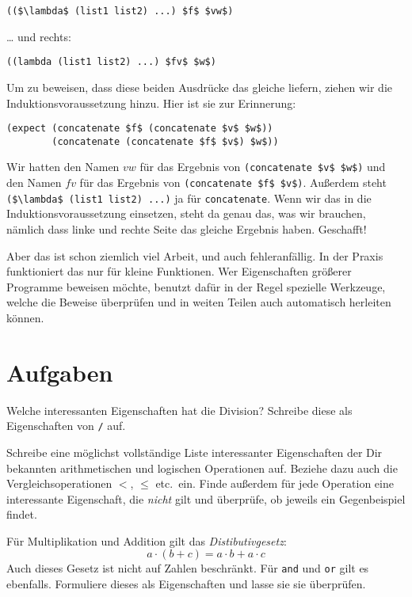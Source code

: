 \begin{lstlisting}
(($\lambda$ (list1 list2) ...) $f$ $vw$)
\end{lstlisting}
% 
\ldots{} und rechts:
\begin{lstlisting}
((lambda (list1 list2) ...) $fv$ $w$)
\end{lstlisting}
%
Um zu beweisen, dass diese beiden Ausdrücke das gleiche liefern,
ziehen wir die Induktionsvoraussetzung hinzu.  Hier ist sie zur
Erinnerung:
\begin{lstlisting}
(expect (concatenate $f$ (concatenate $v$ $w$))
        (concatenate (concatenate $f$ $v$) $w$))
\end{lstlisting}
% 
Wir hatten den Namen $vw$ für das Ergebnis von
\lstinline{(concatenate $v$ $w$)} und den Namen $fv$ für das
Ergebnis von \lstinline{(concatenate $f$ $v$)}.  Außerdem steht
\lstinline{($\lambda$ (list1 list2) ...)} ja für
\lstinline{concatenate}.  Wenn wir das in die
Induktionsvoraussetzung einsetzen, steht da genau das, was wir
brauchen, nämlich dass linke und rechte Seite das gleiche Ergebnis haben.
Geschafft!

Aber das ist schon ziemlich viel Arbeit, und auch
fehleranfällig.  In der Praxis funktioniert das nur für kleine
Funktionen.  Wer Eigenschaften größerer Programme beweisen möchte,
benutzt dafür in der Regel spezielle Werkzeuge, welche die Beweise
überprüfen und in weiten Teilen auch automatisch herleiten können.

\section*{Aufgaben}

\begin{aufgabe}
Welche interessanten Eigenschaften hat die Division?  Schreibe
diese als Eigenschaften von \lstinline{/} auf.
\end{aufgabe}

\begin{aufgabe}
  Schreibe eine möglichst vollständige Liste interessanter
  Eigenschaften der Dir bekannten arithmetischen 
  und logischen Operationen auf.  Beziehe dazu auch die
  Vergleichsoperationen $<$, $\leq$ etc.\ ein.  Finde außerdem
  für jede Operation eine interessante Eigenschaft, die \emph{nicht}
  gilt und überprüfe, ob \drscheme{} jeweils ein Gegenbeispiel
  findet.
\end{aufgabe}

\begin{aufgabe}
  \label{aufgabe:boolean-distrib}
  Für Multiplikation und Addition gilt das
  \textit{Distibutivgesetz}:
  \begin{displaymath}
    a\cdot(b + c) = a\cdot b + a \cdot c
  \end{displaymath}
  Auch dieses Gesetz ist nicht auf Zahlen beschränkt.  Für
  \lstinline{and} und \lstinline{or} gilt es ebenfalls.  Formuliere
  dieses als Eigenschaften und lasse sie \drscheme{} sie überprüfen.
\end{aufgabe}

